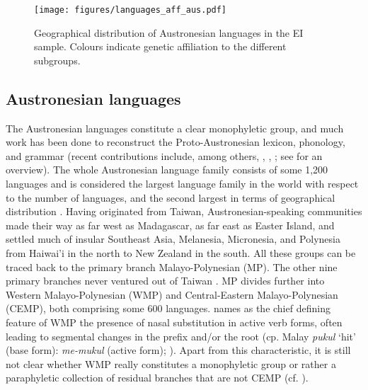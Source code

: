 \begin{sidewaysfigure}
	\texttt{[image: figures/languages\_aff\_aus.pdf]}
	\caption[Geographical distribution of Austronesian languages in the sample]{Geographical distribution of Austronesian languages in the EI sample. Colours indicate genetic affiliation to the different subgroups.}\label{map:Austro1}
\end{sidewaysfigure}


\subsection{Austronesian languages}


The Austronesian languages constitute a clear monophyletic group, and much work has been done to reconstruct the Proto-Austronesian lexicon, phonology, and grammar (recent contributions include, among others, \citealt{Tryon1995}, \citealt{wouk2002history}, \citealt{blust2009austronesian}; see \citealt{adelaar2005austronesian} for an overview). The whole Austronesian language family consists of some 1,200 languages and is considered the largest language family in the world with respect to the number of languages, and the second largest in terms of geographical distribution \citep{adelaar2005austronesian}. Having originated from Taiwan, Austronesian-speaking communities made their way as far west as Madagascar, as far east as Easter Island, and settled much of insular Southeast Asia, Melanesia, Micronesia, and Polynesia from Haiwai'i in the north to New Zealand in the south. All these groups can be traced back to the primary branch Malayo-Polynesian (MP). The other nine primary branch\-es never ventured out of Taiwan \citep{blust2009austronesian}. MP divides further into Western Malayo-Polynesian (WMP) and Central-Eastern Malayo-Polynesian (CEMP), both comprising some 600 languages. \citet{blust2009austronesian} names as the chief defining feature of WMP the presence of nasal substitution in active verb forms, often leading to segmental changes in the prefix and/or the root (cp. Malay \textit{pukul} `hit' (base form): \textit{me-mukul} (active form); \citealt[30]{blust2009austronesian}). Apart from this characteristic, it is still not clear whether WMP really constitutes a monophyletic group or rather a paraphyletic collection of residual branches that are not CEMP (cf. \citealt[30]{blust2009austronesian}). 





